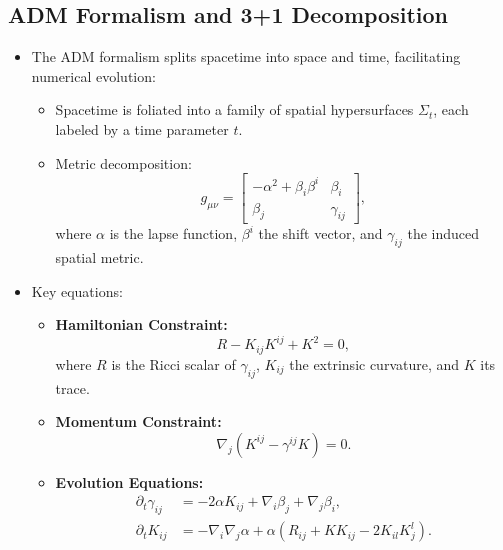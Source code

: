 \documentclass[12pt]{article}
\begin{document}
\subsection{ADM Formalism and 3+1 Decomposition}
\begin{itemize}
    \item The ADM formalism splits spacetime into space and time, facilitating numerical evolution:
    \begin{itemize}
        \item Spacetime is foliated into a family of spatial hypersurfaces $\Sigma_t$, each labeled by a time parameter $t$.
        \item Metric decomposition:
        \begin{equation}
            g_{\mu\nu} = 
            \begin{bmatrix}
                -\alpha^2 + \beta_i \beta^i & \beta_i \\
                \beta_j & \gamma_{ij}
            \end{bmatrix},
        \end{equation}
        where $\alpha$ is the lapse function, $\beta^i$ the shift vector, and $\gamma_{ij}$ the induced spatial metric.
    \end{itemize}
    \item Key equations:
    \begin{itemize}
        \item \textbf{Hamiltonian Constraint:}
        \begin{equation}
            R - K_{ij}K^{ij} + K^2 = 0,
        \end{equation}
        where $R$ is the Ricci scalar of $\gamma_{ij}$, $K_{ij}$ the extrinsic curvature, and $K$ its trace.
        \item \textbf{Momentum Constraint:}
        \begin{equation}
            \nabla_j (K^{ij} - \gamma^{ij} K) = 0.
        \end{equation}
        \item \textbf{Evolution Equations:}
        \begin{align}
            \partial_t \gamma_{ij} &= -2\alpha K_{ij} + \nabla_i \beta_j + \nabla_j \beta_i, \\
            \partial_t K_{ij} &= -\nabla_i \nabla_j \alpha + \alpha (R_{ij} + K K_{ij} - 2K_{il}K^l_j).
        \end{align}
    \end{itemize}
\end{itemize}
\end{document}
